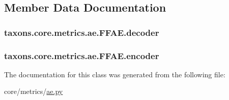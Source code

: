 \subsection{Member Data Documentation}
\subsubsection[{\texorpdfstring{decoder}{decoder}}]{\setlength{\rightskip}{0pt plus 5cm}taxons.\+core.\+metrics.\+ae.\+F\+F\+A\+E.\+decoder}\hypertarget{classtaxons_1_1core_1_1metrics_1_1ae_1_1_f_f_a_e_aadcd88c7f653846a70830e6adbd98458}{}\label{classtaxons_1_1core_1_1metrics_1_1ae_1_1_f_f_a_e_aadcd88c7f653846a70830e6adbd98458}
\subsubsection[{\texorpdfstring{encoder}{encoder}}]{\setlength{\rightskip}{0pt plus 5cm}taxons.\+core.\+metrics.\+ae.\+F\+F\+A\+E.\+encoder}\hypertarget{classtaxons_1_1core_1_1metrics_1_1ae_1_1_f_f_a_e_a6a659ea23dceb6a01e2222fe8545e5fc}{}\label{classtaxons_1_1core_1_1metrics_1_1ae_1_1_f_f_a_e_a6a659ea23dceb6a01e2222fe8545e5fc}


The documentation for this class was generated from the following file\+:\begin{DoxyCompactItemize}
\item 
core/metrics/\hyperlink{ae_8py}{ae.\+py}\end{DoxyCompactItemize}
